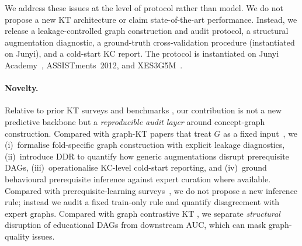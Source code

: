 \documentclass[runningheads]{llncs}
\newcommand{\DDR}{\textsc{DDR}}
\begin{document}
We address these issues at the level of protocol rather than model. We
do not propose a new KT architecture or claim state-of-the-art
performance. Instead, we release a leakage-controlled graph construction
and audit protocol, a structural augmentation diagnostic, a ground-truth
cross-validation procedure (instantiated on Junyi), and a cold-start KC
report. The protocol is instantiated on Junyi
Academy~\cite{junyi_dataset,chang2015junyi}, ASSISTments~2012, and
XES3G5M~\cite{xes3g5m2023}.

\paragraph{Novelty.}
Relative to prior KT surveys and benchmarks
\cite{abdelrahman2023kt_survey,liu2022pykt}, our contribution is not a
new predictive backbone but a \emph{reproducible audit layer} around
concept-graph construction. Compared with graph-KT papers that treat
$G$ as a fixed input~\cite{nakagawa2019gkt,tong2020skt,yang2021gikt,
dygkt2024,dgekt2024}, we (i)~formalise fold-specific graph construction
with explicit leakage diagnostics, (ii)~introduce \DDR{} to quantify how
generic augmentations disrupt prerequisite DAGs, (iii)~operationalise
KC-level cold-start reporting, and (iv)~ground behavioural prerequisite
inference against expert curation where available. Compared with
prerequisite-learning surveys~\cite{bai2025survey,lin2016moocprereq,
pan2020concept}, we do not propose a new inference rule; instead we
audit a fixed train-only rule and quantify disagreement with expert
graphs. Compared with graph contrastive KT
\cite{lee2022cl4kt,song2022biclkt,wan2021contrastive}, we separate
\emph{structural} disruption of educational DAGs from downstream AUC,
which can mask graph-quality issues.
\end{document}
